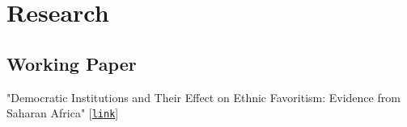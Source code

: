 \documentclass[10pt,letterpaper]{article}
\renewenvironment{itemize}{
  \begin{list}{}{
    \setlength{\leftmargin}{1.5em}
  }
}{
  \end{list}
}
\begin{document}
%
%
%

\section*{Research}
%
\subsection*{Working Paper}
\begin{itemize}
\item "Democratic Institutions and Their Effect on Ethnic Favoritism: Evidence from Saharan Africa" [\href{https://hussainhadah.com/pdf/HussainHadahEthFav.pdf}{\tt link}]
\end{itemize}
\end{document}

